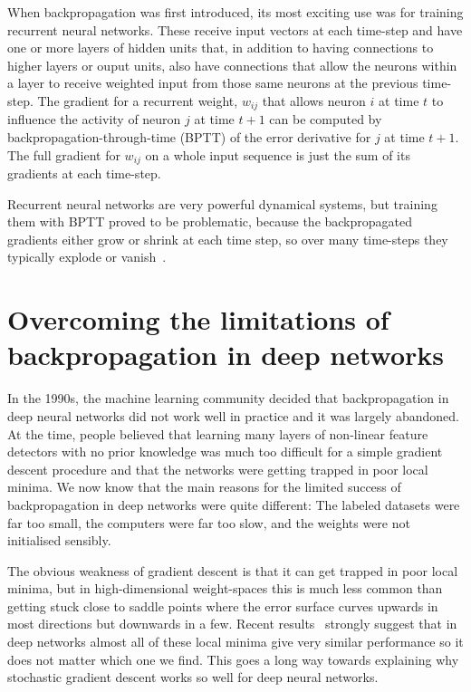 \documentclass[]{article}
\begin{document}
When backpropagation was first introduced, its most exciting use was for
training recurrent neural networks. These receive input vectors at each
time-step and have one or more layers of hidden units that, in addition to
having connections to higher layers or ouput units, also have connections
that allow the neurons within a layer to receive weighted input from those
same neurons at the previous time-step.  The gradient for a recurrent
weight, $w_{ij}$ that allows neuron $i$ at time $t$ to influence the
activity of neuron $j$ at time $t+1$ can be computed by
backpropagation-through-time (BPTT) of the error derivative for $j$ at time
$t+1$. The full gradient for $w_{ij}$ on a whole input sequence is just the
sum of its gradients at each time-step.

Recurrent neural networks are very powerful dynamical systems, but training
them with BPTT proved to be problematic, because the backpropagated
gradients either grow or shrink at each time step, so over many time-steps
they typically explode or vanish~\cite{Bengio-trnn93-small,Hochreiter91-small}.

\section{Overcoming the limitations of backpropagation in deep networks}

In the 1990s, the machine learning community decided that backpropagation
in deep neural networks did not work well in practice and it was largely
abandoned.  At the time, people believed that learning many layers of
non-linear feature detectors with no prior knowledge was much too difficult
for a simple gradient descent procedure and that the networks were getting
trapped in poor local minima. We now know that the main reasons for the
limited success of backpropagation in deep networks were quite different:
The labeled datasets were far too small, the computers were far too slow,
and the weights were not initialised sensibly.

The obvious weakness of gradient descent is that it can get trapped in poor
local minima, but in high-dimensional weight-spaces this is much less
common than getting stuck close to saddle points where the error surface
curves upwards in most directions but downwards in a few. Recent
results~\cite{Dauphin-et-al-NIPS2014-small,Yann} strongly suggest
that in deep networks almost all of these local minima give very similar
performance so it does not matter which one we find.  This goes a long way
towards explaining why stochastic gradient descent works so well for deep
neural networks.
\end{document}
